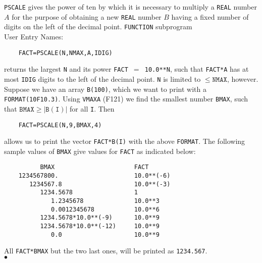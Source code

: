              
               
         
             
{\tt PSCALE} gives the power of ten by which it is necessary to
multiply a {\tt REAL} number $A$ for the purpose of obtaining a new
{\tt REAL} number $B$ having a fixed number of digits on the left of the
decimal point.
\Structure
{\tt FUNCTION} subprogram \\
User Entry Names: 
\Usage
\begin{verbatim}
    FACT=PSCALE(N,NMAX,A,IDIG)
\end{verbatim}
returns the largest {\tt N} and its power {\tt FACT $=$ 10.0**N},
such that {\tt FACT*A} has at most {\tt IDIG} digits to the left of the
decimal point. {\tt N} is limited to $\mathtt{\leq NMAX}$, however.
\Examples
Suppose we have an array {\tt B(100)}, which we want to
print with a {\tt FORMAT(10F10.3)}. Using {\tt VMAXA} (F121)
we find the smallest number {\tt BMAX}, such that
$\mathtt{BMAX \geq |B(I)|}$ for all {\tt I}. Then
\begin{verbatim}
    FACT=PSCALE(N,9,BMAX,4)
\end{verbatim}
allows us to print the vector {\tt FACT*B(I)} with the above
{\tt FORMAT}.
The following sample values of {\tt BMAX} give values for
{\tt FACT} as indicated below:
\begin{verbatim}
          BMAX                      FACT
    1234567800.                     10.0**(-6)
       1234567.8                    10.0**(-3)
          1234.5678                 1
             1.2345678              10.0**3
             0.0012345678           10.0**6
          1234.5678*10.0**(-9)      10.0**9
          1234.5678*10.0**(-12)     10.0**9
             0.0                    10.0**9
\end{verbatim}
All {\tt FACT*BMAX} but the two last ones, will be printed as
{\tt 1234.567}.
\\ $\bullet$
